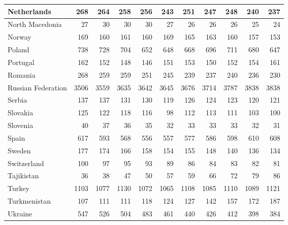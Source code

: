 \begin{table}
\begin{tabular}{|l|r|r|r|r|r|r|r|r|r|r|}
                   Netherlands&    268&    264&    258&    256&    243&    251&    247&    248&    240&    237\\\hline
               North Macedonia&     27&     30&     30&     30&     27&     26&     26&     26&     25&     24\\\hline
                        Norway&    169&    160&    161&    160&    169&    165&    163&    160&    157&    153\\\hline
                        Poland&    738&    728&    704&    652&    648&    668&    696&    711&    680&    647\\\hline
                      Portugal&    162&    152&    148&    146&    151&    153&    150&    152&    154&    161\\\hline
                       Romania&    268&    259&    259&    251&    245&    239&    237&    240&    236&    230\\\hline
            Russian Federation&   3506&   3559&   3635&   3642&   3645&   3676&   3714&   3787&   3838&   3838\\\hline
                        Serbia&    137&    137&    131&    130&    119&    126&    124&    123&    120&    121\\\hline
                      Slovakia&    125&    122&    118&    116&     98&    112&    113&    111&    103&    100\\\hline
                      Slovenia&     40&     37&     36&     35&     32&     33&     33&     33&     32&     31\\\hline
                         Spain&    617&    593&    568&    556&    557&    577&    586&    598&    610&    608\\\hline
                        Sweden&    177&    174&    166&    158&    154&    155&    148&    140&    136&    134\\\hline
                   Switzerland&    100&     97&     95&     93&     89&     86&     84&     83&     82&     81\\\hline
                    Tajikistan&     36&     38&     47&     50&     57&     59&     66&     72&     79&     86\\\hline
                        Turkey&   1103&   1077&   1130&   1072&   1065&   1108&   1085&   1110&   1089&   1121\\\hline
                  Turkmenistan&    107&    111&    111&    118&    124&    127&    142&    157&    172&    187\\\hline
                       Ukraine&    547&    526&    504&    483&    461&    440&    426&    412&    398&    384\\\hline

\end{tabular}
\end{table}
